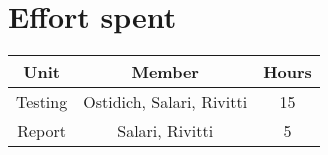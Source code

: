 \chapter{Effort spent}

\begin{table}[h]
    \centering
    \begin{tabular}{|c|c|c|}
        \hline \textbf{Unit} & \textbf{Member} & \textbf{Hours} \\
        \hline Testing & Ostidich, Salari, Rivitti & 15 \\
        \hline Report & Salari, Rivitti & 5 \\
        \hline
    \end{tabular}
\end{table}

